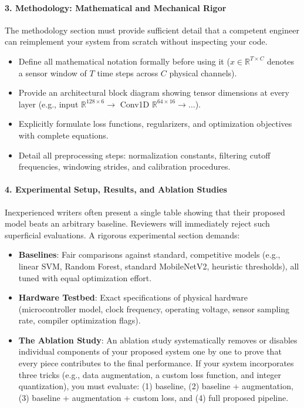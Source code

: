 \paragraph{3. Methodology: Mathematical and Mechanical Rigor}
The methodology section must provide sufficient detail that a competent engineer can reimplement your system from scratch without inspecting your code.
\begin{itemize}
    \item Define all mathematical notation formally before using it ($x \in \mathbb{R}^{T \times C}$ denotes a sensor window of $T$ time steps across $C$ physical channels).
    \item Provide an architectural block diagram showing tensor dimensions at every layer (e.g., input $\mathbb{R}^{128 \times 6} \to$ Conv1D $\mathbb{R}^{64 \times 16} \to \dots$).
    \item Explicitly formulate loss functions, regularizers, and optimization objectives with complete equations.
    \item Detail all preprocessing steps: normalization constants, filtering cutoff frequencies, windowing strides, and calibration procedures.
\end{itemize}

\paragraph{4. Experimental Setup, Results, and Ablation Studies}
Inexperienced writers often present a single table showing that their proposed model beats an arbitrary baseline. Reviewers will immediately reject such superficial evaluations. A rigorous experimental section demands:
\begin{itemize}
    \item \textbf{Baselines}: Fair comparisons against standard, competitive models (e.g., linear SVM, Random Forest, standard MobileNetV2, heuristic thresholds), all tuned with equal optimization effort.
    \item \textbf{Hardware Testbed}: Exact specifications of physical hardware (microcontroller model, clock frequency, operating voltage, sensor sampling rate, compiler optimization flags).
    \item \textbf{The Ablation Study}: An ablation study systematically removes or disables individual components of your proposed system one by one to prove that every piece contributes to the final performance. If your system incorporates three tricks (e.g., data augmentation, a custom loss function, and integer quantization), you must evaluate: (1) baseline, (2) baseline + augmentation, (3) baseline + augmentation + custom loss, and (4) full proposed pipeline.
\end{itemize}

